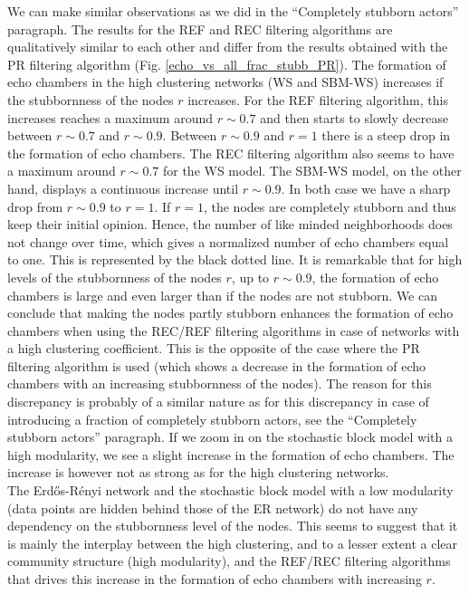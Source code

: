 \documentclass[11 pt , letterpaper , twoside , openright]{book}
\begin{document}
We can make similar observations as we did in the ``Completely stubborn actors'' paragraph. The results for the REF and REC filtering algorithms are qualitatively similar to each other and differ from the results obtained with the PR filtering algorithm (Fig. \ref{echo_vs_all_frac_stubb_PR}). The formation of echo chambers in the high clustering networks (WS and SBM-WS) increases if the stubbornness of the nodes $r$ increases. For the REF filtering algorithm, this increases reaches a maximum around $r \sim 0.7$ and then starts to slowly decrease between $r\sim 0.7$ and $r\sim 0.9$. Between $r \sim 0.9$ and $r=1$ there is a steep drop in the formation of echo chambers. The REC filtering algorithm also seems to have a maximum around $r \sim 0.7$ for the WS model. The SBM-WS model, on the other hand, displays a continuous increase until $r \sim 0.9$. In both case we have a sharp drop from $r \sim 0.9$ to $r=1$. If $r=1$, the nodes are completely stubborn and thus keep their initial opinion. Hence, the number of like minded neighborhoods does not change over time, which gives a normalized number of echo chambers equal to one. This is represented by the black dotted line. It is remarkable that for high levels of the stubbornness of the nodes $r$, up to $r \sim 0.9$, the formation of echo chambers is large and even larger than if the nodes are not stubborn. We can conclude that making the nodes partly stubborn enhances the formation of echo chambers when using the REC/REF filtering algorithms in case of networks with a high clustering coefficient. This is the opposite of the case where the PR filtering algorithm is used (which shows a decrease in the formation of echo chambers with an increasing stubbornness of the nodes). The reason for this discrepancy is probably of a similar nature as for this discrepancy in case of introducing a fraction of completely stubborn actors, see the ``Completely stubborn actors'' paragraph. If we zoom in on the stochastic block model with a high modularity, we see a slight increase in the formation of echo chambers. The increase is however not as strong as for the high clustering networks.\\
\newline
The Erd\H{o}s-R\'{e}nyi network and the stochastic block model with a low modularity (data points are hidden behind those of the ER network) do not have any dependency on the stubbornness level of the nodes. This seems to suggest that it is mainly the interplay between the high clustering, and to a lesser extent a clear community structure (high modularity), and the REF/REC filtering algorithms that drives this increase in the formation of echo chambers with increasing $r$. %
\end{document}
